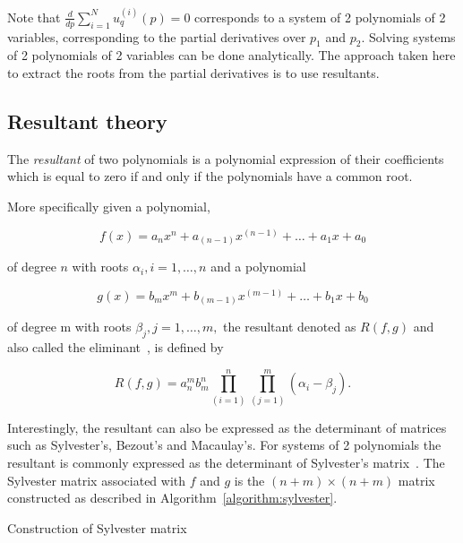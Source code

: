 Note that \(\frac{d}{dp} \sum\limits_{i=1} ^ N  u_q^{(i)}(p) = 0\) corresponds
to a system of 2 polynomials of 2 variables, corresponding to the partial
derivatives over \(p_1\) and \(p_2\). Solving systems of 2 polynomials of 2
variables can be done analytically. The approach taken here to extract the roots
from the partial derivatives is to use resultants.

\subsection{Resultant theory}

The \textit{resultant} of two polynomials is a polynomial expression of
their coefficients which is equal to zero if and only if the polynomials have a
common root. 

More specifically given a polynomial,

\[ f(x) = a_n x^n + a_{(n-1)} x ^{(n-1)} + \dots +a_1 x + a_0 \]

of degree \(n\) with roots \(\alpha_i, i=1, \dots, n\) and a polynomial

\[ g(x) = b_m x ^m + b_{(m-1)} x^{(m-1)} + \dots + b_1 x + b_0 \]

of degree m with roots \(\beta_j, j=1, \dots , m,\) the resultant denoted as \(R(f, g)\)
and also called the eliminant~\cite{Salmon1924}, is defined by

\begin{equation}\label{eq:resultant_definition}
R(f, g) = a_n^m b_m^n \prod_{(i=1)}^n \prod_{(j=1)}^m ( \alpha_i - \beta_j).
\end{equation}

Interestingly, the resultant can also be expressed as the determinant of
matrices such as Sylvester's, Bezout's and Macaulay's. For systems
of 2 polynomials the resultant is commonly expressed as the determinant of 
Sylvester's matrix~\cite{Akritas2014}. The Sylvester matrix associated with
\(f\) and \(g\) is the \((n + m) \times (n + m)\) matrix constructed as
described in Algorithm~\ref{algorithm:sylvester}.

\begin{algorithm}[H]
\caption{Construction of Sylvester matrix~\cite{Akritas2014}}\label{algorithm:sylvester}
\end{algorithm}


